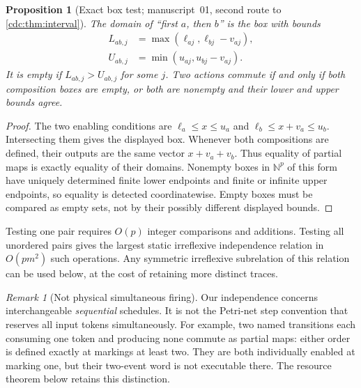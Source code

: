 \documentclass[11pt,a4paper]{article}
\newtheorem{proposition}[proposition]{Proposition}
\theoremstyle{definition}
\theoremstyle{remark}
\newtheorem{remark}[remark]{Remark}
\newcommand{\N}{\mathbb N}
\begin{document}
\begin{proposition}[Exact box test; manuscript~01, second route to \cref{cdc:thm:interval}]\label{cdc:ct:prop:boxes}
The domain of ``first $a$, then $b$'' is the box with bounds
\begin{align}
 L_{ab,j}&=\max(\ell_{aj},\ell_{bj}-v_{aj}),\label{cdc:ct:eq:pair-lower}\\
 U_{ab,j}&=\min(u_{aj},u_{bj}-v_{aj}).\label{cdc:ct:eq:pair-upper}
\end{align}
It is empty if $L_{ab,j}>U_{ab,j}$ for some $j$. Two actions commute if and only if both composition boxes are empty, or both are nonempty and their lower and upper bounds agree.
\end{proposition}
\begin{proof}
The two enabling conditions are $\ell_a\le x\le u_a$ and $\ell_b\le x+v_a\le u_b$. Intersecting them gives the displayed box. Whenever both compositions are defined, their outputs are the same vector $x+v_a+v_b$. Thus equality of partial maps is exactly equality of their domains. Nonempty boxes in $\N^p$ of this form have uniquely determined finite lower endpoints and finite or infinite upper endpoints, so equality is detected coordinatewise. Empty boxes must be compared as empty sets, not by their possibly different displayed bounds.
\end{proof}
Testing one pair requires $O(p)$ integer comparisons and additions. Testing all unordered pairs gives the largest static irreflexive independence relation in $O(pm^2)$ such operations. Any symmetric irreflexive subrelation of this relation can be used below, at the cost of retaining more distinct traces.

\begin{remark}[Not physical simultaneous firing]\label{cdc:ct:rem:not-step}
Our independence concerns interchangeable \emph{sequential} schedules. It is not the Petri-net step convention that reserves all input tokens simultaneously. For example, two named transitions each consuming one token and producing none commute as partial maps: either order is defined exactly at markings at least two. They are both individually enabled at marking one, but their two-event word is not executable there. The resource theorem below retains this distinction.
\end{remark}
\end{document}
